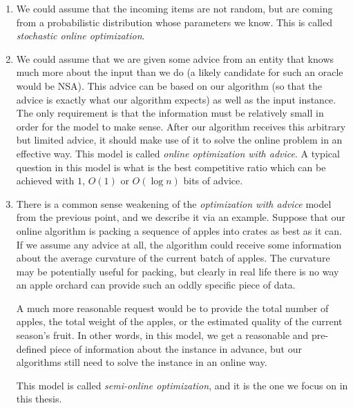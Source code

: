 \begin{enumerate}

\item We could assume that the incoming items are not random, but
are coming from a probabilistic distribution whose parameters we know.
This is called \textit{stochastic online optimization}.

\item We could assume that we are given some advice from an entity
that knows much more about the input than we do (a likely candidate
for such an oracle would be NSA). This advice can be based on our
algorithm (so that the advice is exactly what our algorithm expects)
as well as the input instance. The only requirement is that the
information must be relatively small in order for the model to make
sense. After our algorithm receives this arbitrary but limited advice,
it should make use of it to solve the online problem in an effective
way. This model is called \textit{online optimization with advice}. A
typical question in this model is what is the best competitive ratio
which can be achieved with $1$, $O(1)$ or $O(\log n)$ bits of advice.

\item There is a common sense weakening of the \textit{optimization
with advice} model from the previous point, and we describe it
via an example. Suppose that our online algorithm is packing a
sequence of apples into crates as best as it can. If we assume any
advice at all, the algorithm could receive some information about the
average curvature of the current batch of apples. The curvature may
be potentially useful for packing, but clearly in real life there is no
way an apple orchard can provide such an oddly specific piece of data.

A much more reasonable request would be to provide the total number of
apples, the total weight of the apples, or the estimated quality of
the current season's fruit. In other words, in this model, we get a
reasonable and pre-defined piece of information about the instance in
advance, but our algorithms still need to solve the instance in an
online way.

This model is called \textit{semi-online optimization}, and it is the
one we focus on in this thesis.


\end{enumerate}